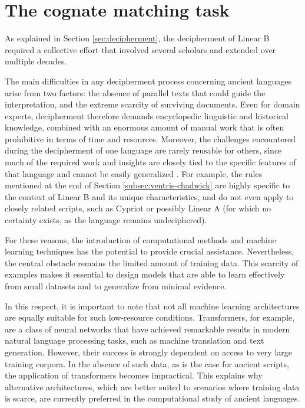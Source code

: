 \chapter{The cognate matching task} \label{chap:cognates}
As explained in Section \ref{sec:decipherment}, the decipherment of Linear B required a collective effort that involved several scholars and extended over multiple decades.

The main difficulties in any decipherment process concerning ancient languages arise from two factors: the absence of parallel texts that could guide the interpretation, and the extreme scarcity of surviving documents.
Even for domain experts, decipherment therefore demands encyclopedic linguistic and historical knowledge, combined with an enormous amount of manual work that is often prohibitive in terms of time and resources.
Moreover, the challenges encountered during the decipherment of one language are rarely reusable for others, since much of the required work and insights are closely tied to the specific features of that language and cannot be easily generalized \cite{luo}.
For example, the rules mentioned at the end of Section \ref{subsec:ventris-chadwick} are highly specific to the context of Linear B and its unique characteristics, and do not even apply to closely related scripts, such as Cypriot or possibly Linear A (for which no certainty exists, as the language remains undeciphered).

For these reasons, the introduction of computational methods and machine learning techniques has the potential to provide crucial assistance.
Nevertheless, the central obstacle remains the limited amount of training data.
This scarcity of examples makes it essential to design models that are able to learn effectively from small datasets and to generalize from minimal evidence.

In this respect, it is important to note that not all machine learning architectures are equally suitable for such low-resource conditions.
Transformers, for example, are a class of neural networks that have achieved remarkable results in modern natural language processing tasks, such as machine translation and text generation.
However, their success is strongly dependent on access to very large training corpora.
In the absence of such data, as is the case for ancient scripts, the application of transformers becomes impractical.
This explains why alternative architectures, which are better suited to scenarios where training data is scarce, are currently preferred in the computational study of ancient languages.

